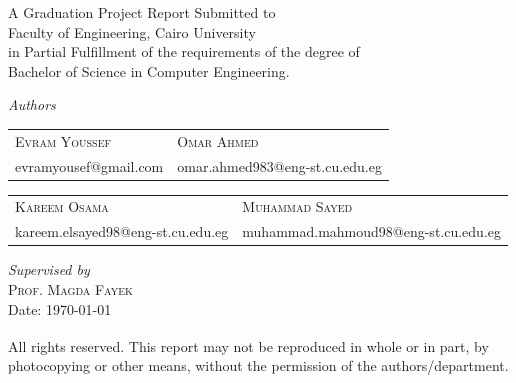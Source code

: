 \documentclass[a4paper,12pt]{report}
\begin{document}
\begin{titlepage}
\begin{center}
  {\LARGE{A Graduation Project Report Submitted to} \\[0.1cm] }
  {\LARGE {Faculty of Engineering, Cairo University} \\[0.1cm] }
  {\LARGE {in Partial Fulfillment of the requirements of the degree of} \\[0.1cm] }
  {\LARGE {Bachelor of Science in Computer Engineering.} \\[0.1cm] }
  \vspace{1cm}


\begin{center}
  {\LARGE \textit{Authors}}\\[0.5cm]

  \setlength{\tabcolsep}{1.5cm}
  \begin{tabular}{M{5cm}M{5cm}}
  \large \textsc{Evram Youssef} & \large \textsc{Omar Ahmed}\\[0.1cm]
  \large evramyousef@gmail.com & \large omar.ahmed983@eng-st.cu.edu.eg\\[0.1cm]
  \end{tabular}

  \vspace{0.9cm}

  \setlength{\tabcolsep}{1.5cm}
  \begin{tabular}{M{5cm}M{5cm}}
  \large \textsc{Kareem Osama} & \large \textsc{Muhammad Sayed}\\[0.1cm]
  \large kareem.elsayed98@eng-st.cu.edu.eg & \large muhammad.mahmoud98@eng-st.cu.edu.eg\\[0.2cm]
    
  \end{tabular}
  \vspace{1cm}

  {\LARGE \textit{Supervised by}}\\
  \LARGE \textsc{Prof. Magda Fayek }\\[0.5cm]

  {\large {Date: \today}}
  \vspace{0.5cm}

  \small {\textsuperscript{\textcopyright} All rights reserved. This report may not be reproduced in whole or in part, by photocopying or other means, without the permission of the authors/department.}

\end{center}


\end{center}
\end{titlepage}
\end{document}
